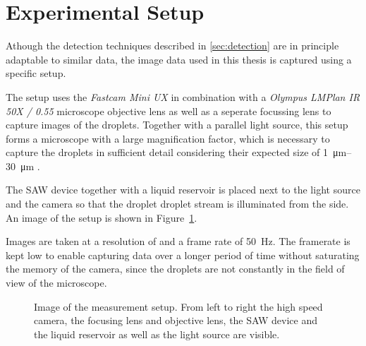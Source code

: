 \section{Experimental Setup}
\label{sec:setup}

Athough the detection techniques described in \ref{sec:detection} are in principle adaptable to similar data, the image data used in this thesis is captured using a specific setup. 

The setup uses the \emph{Fastcam Mini UX} in combination with a \emph{Olympus LMPlan IR 50X / 0.55} microscope objective lens as well as a seperate focussing lens to capture images of the droplets.
Together with a parallel light source, this setup forms a microscope with a large magnification factor, which is necessary to capture the droplets in sufficient detail considering their expected size of \SIrange{1}{30}{\micro\meter} \cite{kapplAkustischInduzierteVernebelung2022}.

The SAW device together with a liquid reservoir is placed next to the light source and the camera so that the droplet droplet stream is illuminated from the side. An image of the setup is shown in Figure~\ref{fig:setup}.

Images are taken at a resolution of  and a frame rate of \SI{50}{\hertz}. The framerate is kept low to enable capturing data over a longer period of time without saturating the memory of the camera, since the droplets are not constantly in the field of view of the microscope. 

\begin{figure}[htbp]
    \centering
    \vspace{0.2cm}
    \caption{Image of the measurement setup. From left to right the high speed camera, the focusing lens and objective lens, the SAW device and the liquid reservoir as well as the light source are visible.}
    \label{fig:setup}
\end{figure}